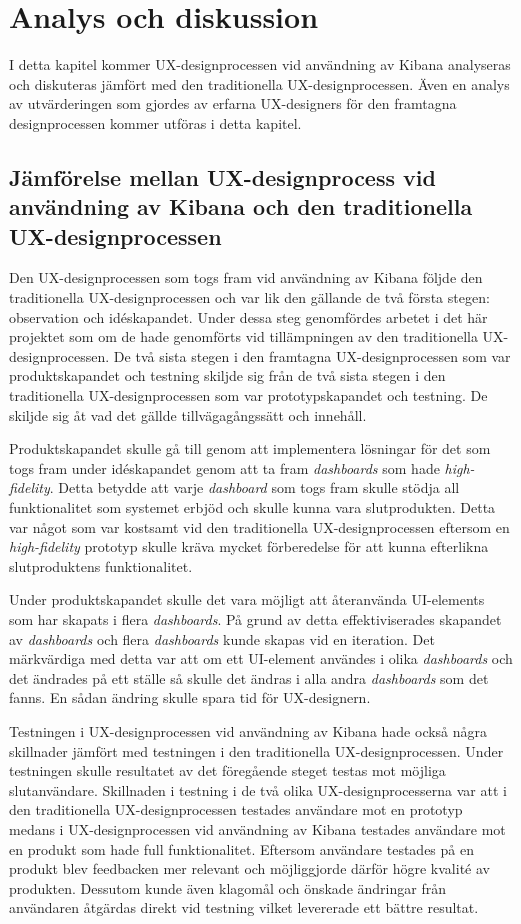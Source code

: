 \documentclass[12pt]{kththesis}
\begin{document}
\afterpage{\null\newpage}

\chapter{Analys och diskussion}
I detta kapitel kommer UX-designprocessen vid användning av Kibana analyseras och diskuteras jämfört med den traditionella UX-designprocessen. Även en analys av utvärderingen som gjordes av erfarna UX-designers för den framtagna designprocessen kommer utföras i detta kapitel. 

\section{Jämförelse mellan UX-designprocess vid användning av Kibana och den traditionella UX-designprocessen}
Den UX-designprocessen som togs fram vid användning av Kibana följde den traditionella UX-designprocessen och var lik den gällande de två första stegen: observation och idéskapandet. Under dessa steg genomfördes arbetet i det här projektet som om de hade genomförts vid tillämpningen av den traditionella UX-designprocessen. De två sista stegen i den framtagna UX-designprocessen som var produktskapandet och testning skiljde sig från de två sista stegen i den traditionella UX-designprocessen som var prototypskapandet och testning. De skiljde sig åt vad det gällde tillvägagångssätt och innehåll. 

Produktskapandet skulle gå till genom att implementera lösningar för det som togs fram under idéskapandet genom att ta fram \textit{dashboards} som hade \textit{high-fidelity}. Detta betydde att varje \textit{dashboard} som togs fram skulle stödja all funktionalitet som systemet erbjöd och skulle kunna vara slutprodukten. Detta var något som var kostsamt vid den traditionella UX-designprocessen eftersom en \textit{high-fidelity} prototyp skulle kräva mycket förberedelse för att kunna efterlikna slutproduktens funktionalitet. 

Under produktskapandet skulle det vara möjligt att återanvända UI-elements som har skapats i flera \textit{dashboards}. På grund av detta effektiviserades skapandet av \textit{dashboards} och flera \textit{dashboards} kunde skapas vid en iteration. Det märkvärdiga med detta var att om ett UI-element användes i olika \textit{dashboards} och det ändrades på ett ställe så skulle det ändras i alla andra \textit{dashboards} som det fanns. En sådan ändring skulle spara tid för UX-designern. 

Testningen i UX-designprocessen vid användning av Kibana hade också några skillnader jämfört med testningen i den traditionella UX-designprocessen. Under testningen skulle resultatet av det föregående steget testas mot möjliga slutanvändare. Skillnaden i testning i de två olika UX-designprocesserna var att i den traditionella UX-designprocessen testades användare mot en prototyp medans i UX-designprocessen vid användning av Kibana testades användare mot en produkt som hade full funktionalitet. Eftersom användare testades på en produkt blev feedbacken mer relevant och möjliggjorde därför högre kvalité av produkten. Dessutom kunde även klagomål och önskade ändringar från användaren åtgärdas direkt vid testning vilket levererade ett bättre resultat.
\end{document}
